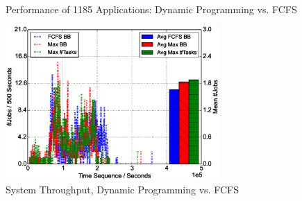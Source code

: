 \begin{figure}[!t]
        \centering
        ~
        \caption{Performance of 1185 Applications: Dynamic Programming vs. FCFS}
        \label{Fig:DPvsFIFOPerformance}
\end{figure}

\begin{figure}[!t]
        \centering
        \includegraphics[width=3.2in]{DrawDPvsFIFO/1000jobs_dp_vs_fifo_throughput}
        \caption{System Throughput, Dynamic Programming vs. FCFS}
        \label{Fig:DPvsFIFOThroughput}
\end{figure}

